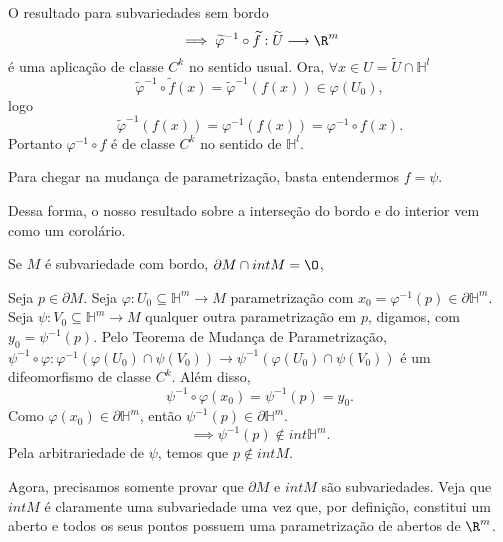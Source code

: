 \begin{demo}
    O resultado para subvariedades sem bordo \[
    \implies \widetilde{\varphi }^{-1} \circ \widetilde{f} : \widetilde{U} \longrightarrow \R^{m}
    \] é uma aplicação de classe $C^{k}$ no sentido usual. Ora, $\forall x\in U = \widetilde{U}\cap \mathbb{H}^{l}$ \[
    \widetilde{\varphi }^{-1} \circ \widetilde{f}\left( x \right)  = \widetilde{\varphi }^{-1}\left( f\left( x \right)  \right) \in \varphi \left( U_0 \right) 
    ,\] logo \[
    \widetilde{\varphi }^{-1}\left( f\left( x \right)  \right) = \varphi ^{-1}\left( f\left( x \right)  \right) = \varphi ^{-1}\circ f \left( x \right) 
    .\] Portanto $\varphi ^{-1}\circ f$ é de classe $C^{k}$ no sentido de $\mathbb{H}^{l}$.
\end{demo}

Para chegar na mudança de parametrização, basta entendermos $f = \psi$.

Dessa forma, o nosso resultado sobre a interseção do bordo e do interior vem como um corolário.

\begin{corollary}
    Se $M$ é subvariedade com bordo, $\partial M \cap int M = \O$,
\end{corollary}

\begin{demo}
    Seja $p \in \partial M$. Seja $\varphi : U_0\subseteq\mathbb{H}^{m} \longrightarrow M$ parametrização com $x_0 = \varphi ^{-1}\left( p \right) \in \partial \mathbb{H}^{m}$. Seja $\psi: V_0\subseteq\mathbb{H}^{m} \longrightarrow M$ qualquer outra parametrização em $p$, digamos, com $y_0 = \psi^{-1}\left( p \right) $. Pelo Teorema de Mudança de Parametrização, $\psi^{-1}\circ \varphi : \varphi ^{-1}\left( \varphi \left( U_0 \right) \cap \psi\left( V_0 \right)  \right)  \longrightarrow \psi^{-1}\left( \varphi \left( U_0 \right) \cap \psi\left( V_0 \right) \right)  $ é um difeomorfismo de classe $C^{k}$. Além disso, \[
    \psi^{-1}\circ \varphi \left( x_0 \right) = \psi^{-1}\left( p \right) = y_0
    .\] Como $\varphi \left( x_0 \right) \in \partial \mathbb{H}^{m}$, então $\psi^{-1}\left( p \right) \in \partial \mathbb{H}^{m}$.\[
    \implies \psi ^{-1}\left( p \right) \not\in int \mathbb{H}^{m}
    .\] Pela arbitrariedade de $\psi$, temos que $p \not\in int M$.
\end{demo}

Agora, precisamos somente provar que $\partial M$ e $int M$ são subvariedades. Veja que $int M$ é claramente uma subvariedade uma vez que, por definição, constitui um aberto e todos os seus pontos possuem uma parametrização de abertos de $\R^{m}$.

